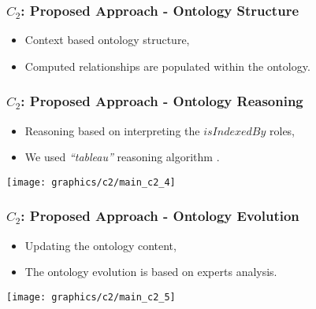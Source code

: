 \begin{frame}
	\frametitle{$C_{2}$: Proposed Approach - Ontology Structure}
	\begin{block}{}
	 \begin{itemize}
	  \item \alert{Context based} ontology structure,
	  \item Computed \alert{relationships} are populated within the ontology.
	 \end{itemize}
	\end{block}
\end{frame}

\begin{frame}
	\frametitle{$C_{2}$: Proposed Approach - Ontology Reasoning}
	\begin{block}{}
	 \begin{itemize}
	  \item Reasoning based on interpreting the \alert{$isIndexedBy$} roles,
	  \item We used \alert{\textit{``tableau''}} reasoning algorithm \tiny{\citep{Horrocks2005}}.
	 \end{itemize}
	\end{block}
	{\hspace*{-1cm}\centering\texttt{[image: graphics/c2/main\_c2\_4]}}
\end{frame}

\begin{frame}
	\frametitle{$C_{2}$: Proposed Approach - Ontology Evolution}
	\begin{block}{}
	 \begin{itemize}
	  \item \alert{Updating} the ontology content,
	  \item The ontology evolution is based on \alert{experts} analysis.
	 \end{itemize}
	\end{block}
	{\hspace*{-1cm}\centering\texttt{[image: graphics/c2/main\_c2\_5]}}
\end{frame}


